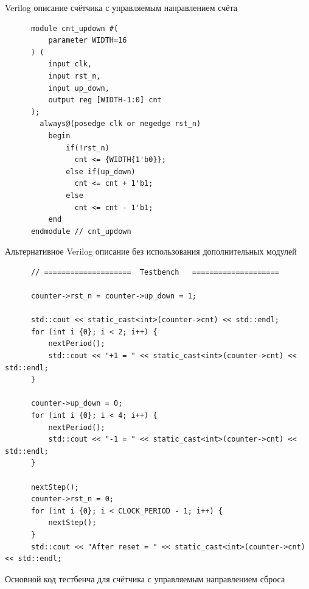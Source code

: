 \documentclass[a4paper]{article}
\begin{document}
  \begin{listing}[H]
    \inputminted{verilog}{../chapter_6/cnt_ud/counter.v}
    \caption{Verilog описание счётчика с управляемым направлением счёта}
  \end{listing}

  \begin{listing}[H]
    \begin{verbatim}
      module cnt_updown #( 
          parameter WIDTH=16
      ) (
          input clk,
          input rst_n,
          input up_down, 
          output reg [WIDTH-1:0] cnt
      );
        always@(posedge clk or negedge rst_n)
          begin
              if(!rst_n)
                cnt <= {WIDTH{1'b0}};
              else if(up_down)
                cnt <= cnt + 1'b1;
              else
                cnt <= cnt - 1'b1;
          end
      endmodule // cnt_updown
    \end{verbatim}
    \caption{Альтернативное Verilog описание без использования дополнительных модулей}
  \end{listing}

  \begin{listing}[H]
    \begin{verbatim}
      // ====================  Testbench   ====================

      counter->rst_n = counter->up_down = 1;
  
      std::cout << static_cast<int>(counter->cnt) << std::endl;
      for (int i {0}; i < 2; i++) {
          nextPeriod();
          std::cout << "+1 = " << static_cast<int>(counter->cnt) << std::endl;
      }
  
      counter->up_down = 0;
      for (int i {0}; i < 4; i++) {
          nextPeriod();
          std::cout << "-1 = " << static_cast<int>(counter->cnt) << std::endl;
      }
  
      nextStep();
      counter->rst_n = 0;
      for (int i {0}; i < CLOCK_PERIOD - 1; i++) {
          nextStep();
      }
      std::cout << "After reset = " << static_cast<int>(counter->cnt) << std::endl;
    \end{verbatim}
    \caption{Основной код тестбенча для счётчика с управляемым направлением сброса} 
  \end{listing}
\end{document}
